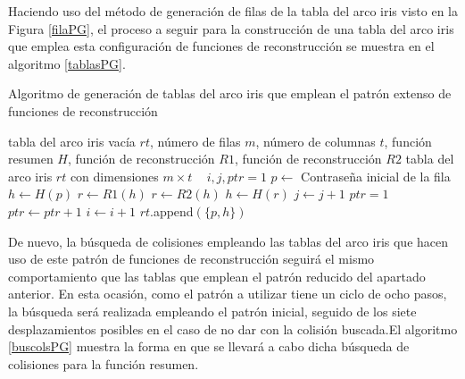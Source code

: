 \documentclass[12pt,spanish,listoffigures,listoftables,listofalgorithms]{tfgetsinf}
\begin{document}
Haciendo uso del método de generación de filas de la tabla del arco iris visto en la Figura \ref{filaPG}, el proceso a seguir para la construcción de una tabla del arco iris que emplea esta configuración de funciones de reconstrucción se muestra en el algoritmo \ref{tablasPG}.

\begin{algorithm}[H]
	\caption{Algoritmo de generación de tablas del arco iris que emplean el patrón extenso de funciones de reconstrucción}
	\label{tablasPG}
	\begin{algorithmic}
		\REQUIRE tabla del arco iris vacía $rt$, número de filas $m$, número de columnas $t$, función resumen $H$, función de reconstrucción $R1$, función de reconstrucción $R2$
		\ENSURE tabla del arco iris $rt$ con dimensiones $m \times t$
		\STATE ~
		\STATE $i, j, ptr = 1$
			\STATE $p \leftarrow$ Contraseña inicial de la fila
			\STATE $h \leftarrow H(p)$
					\STATE $r \leftarrow R1(h)$
				\ELSE
					\STATE $r \leftarrow R2(h)$
				\ENDIF
				\STATE $h \leftarrow H(r)$
				\STATE $j \leftarrow j + 1$
					\STATE $ptr = 1$
				\ELSE
					\STATE $ptr \leftarrow ptr + 1$
				\ENDIF
			\ENDWHILE
			\STATE $i \leftarrow i + 1$
			\STATE $rt$.append$(\{p, h\})$
		\ENDWHILE
	\end{algorithmic}
\end{algorithm}

De nuevo, la búsqueda de colisiones empleando las tablas del arco iris que hacen uso de este patrón de funciones de reconstrucción seguirá el mismo comportamiento que las tablas que emplean el patrón reducido del apartado anterior. En esta ocasión, como el patrón a utilizar tiene un ciclo de ocho pasos, la búsqueda será realizada empleando el patrón inicial, seguido de los siete desplazamientos posibles en el caso de no dar con la colisión buscada.El algoritmo \ref{buscolsPG} muestra la forma en que se llevará a cabo dicha búsqueda de colisiones para la función resumen.
\end{document}
